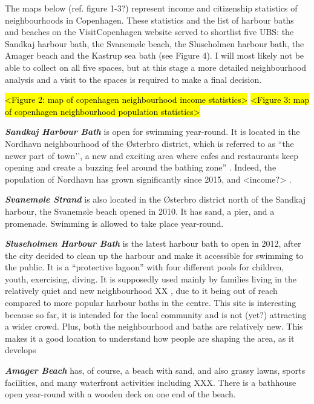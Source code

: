 \documentclass{article}
\newcommand{\bisection}[1]{\textbf{\textit{#1}}}
\begin{document}
The maps below (ref. figure 1-3?) represent income and citizenship statistics of neighbourhoods in Copenhagen. These statistics and the list of harbour baths and beaches on the VisitCopenhagen website \parencite{visitcopenhagen} served to shortlist five UBS: the Sandkaj harbour bath, the Svanemøle beach, the Sluseholmen harbour bath, the Amager beach and the Kastrup sea bath (see Figure 4). I will most likely not be able to collect on all five spaces, but at this stage a more detailed neighbourhood analysis and a visit to the spaces is required to make a final decision.

\hl{<Figure 2: map of copenhagen neighbourhood income statistics>}
\hl{<Figure 3: map of copenhagen neighbourhood population statistics>}

\bisection{Sandkaj Harbour Bath} is open for swimming year-round. It is located in the Nordhavn neighbourhood of the Østerbro district, which is referred to as ``the newer part of town’’, a new and exciting area where cafes and restaurants keep opening and create a buzzing feel around the bathing zone” \parencite{visitcopenhagenSandkaj}. Indeed, the population of Nordhavn has grown significantly since 2015, and <income?> \parencite{copenhagenStatbank}.

\bisection{Svanemøle Strand} is also located in the Østerbro district north of the Sandkaj harbour, the Svanemøle beach opened in 2010. It has sand, a pier, and a promenade. Swimming is allowed to take place year-round.

\bisection{Sluseholmen Harbour Bath} is the latest harbour bath to open in 2012, after the city decided to clean up the harbour and make it accessible for swimming to the public. It is a “protective lagoon” \parencite{visitcopenhagenSluseholmen} with four different pools for children, youth, exercising, diving. It is supposedly used mainly by families living in the relatively quiet and new neighbourhood XX \parencite{bak_2015}, due to it being out of reach compared to more popular harbour baths in the centre. This site is interesting because so far, it is intended for the local community and is not (yet?) attracting a wider crowd. Plus, both the neighbourhood and baths are relatively new. This makes it a good location to understand how people are shaping the area, as it develops

\bisection{Amager Beach} has, of course, a beach with sand, and also grassy lawns, sports facilities, and many waterfront activities including XXX. There is a bathhouse open year-round with a wooden deck on one end of the beach.
\end{document}
